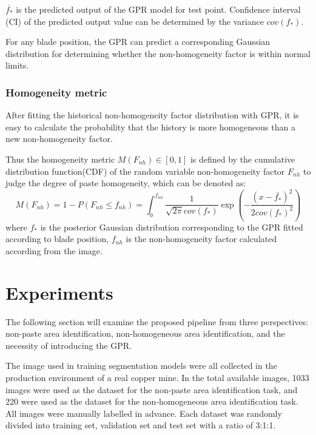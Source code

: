 \documentclass[pdflatex,sn-mathphys]{sn-jnl}%
\theoremstyle{thmstyleone}%
\theoremstyle{thmstyletwo}%
\theoremstyle{thmstylethree}%
\begin{document}
$\overline{f_*}$  is the predicted output of the GPR model for test point. Confidence interval (CI) of the predicted output value can be determined by the variance $cov(f_*)$.
\par

For any blade position, the GPR can predict a corresponding Gaussian distribution for determining whether the non-homogeneity factor is within normal limits.\par



\subsubsection{Homogeneity metric}\label{2.3.2}

 After fitting the historical non-homogeneity factor distribution with GPR, it is easy to calculate the probability that the history is more homogeneous than a new non-homogeneity factor.       
 
Thus the homogeneity metric $M(F_{nh}) \in [0,1]$ is defined by the cumulative distribution function(CDF) of the random variable non-homogeneity factor $F_{nh}$ to judge the degree of paste homogeneity,  which can be denoted as:
\begin{equation}
    M(F_{nh}) =1- P(F_{nh} \leq f_{nh})=\int_{0}^{f_{nh}}\frac{1}{\sqrt{2 \pi} cov(f_*)} \exp \left(-\frac{(x-\bar{f_*} )^{2}}{2  cov(f_*)^{2}}\right)
\end{equation}
where $f_*$ is the posterior Gaussian distribution  corresponding to the GPR fitted according to blade position, $f_{nh}$ is the non-homogeneity factor calculated according from the image.

\section{Experiments}\label{sec5}
The following section will examine the proposed pipeline from three perspectives: 
non-paste area identification, non-homogeneous area identification, and the necessity of introducing the GPR.\par
The image used in training segmentation models were all collected in the production environment of a real copper mine. In the total available images, 1033 images were used as the dataset for the non-paste area identification task, and 220 were used as the dataset for the non-homogeneous area identification task. 
All images were manually labelled in advance. 
Each dataset was randomly divided into training set, validation set and test set with a ratio of 3:1:1.         
\end{document}
